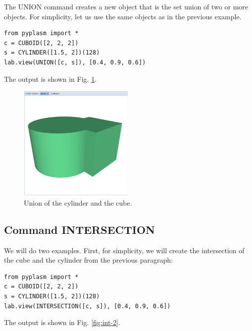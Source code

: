 \documentclass[article,A4,12pt]{llncs}
\begin{document}
The UNION command creates a new object that is the set union 
of two or more objects. For simplicity, let us use the same objects
as in the previous example. 

\begin{verbatim}
from pyplasm import *
c = CUBOID([2, 2, 2])
s = CYLINDER([1.5, 2])(128)
lab.view(UNION([c, s]), [0.4, 0.9, 0.6]) 
\end{verbatim}
The output is shown in Fig. \ref{fig:union}.


\begin{figure}[!ht]
\begin{center}
\includegraphics[width=0.5\textwidth]{img/union.png}
\end{center}
\vspace{-2mm}
\caption{Union of the cylinder and the cube.}
\label{fig:union}
\end{figure}


\subsection{Command INTERSECTION}

We will do two examples. First, for simplicity, we will create the intersection
of the cube and the cylinder from the previous paragraph:
 
\begin{verbatim}
from pyplasm import *
c = CUBOID([2, 2, 2])
s = CYLINDER([1.5, 2])(128)
lab.view(INTERSECTION([c, s]), [0.4, 0.9, 0.6]) 
\end{verbatim}
The output is shown in Fig. \ref{fig:int-2}.

\newpage
\end{document}
